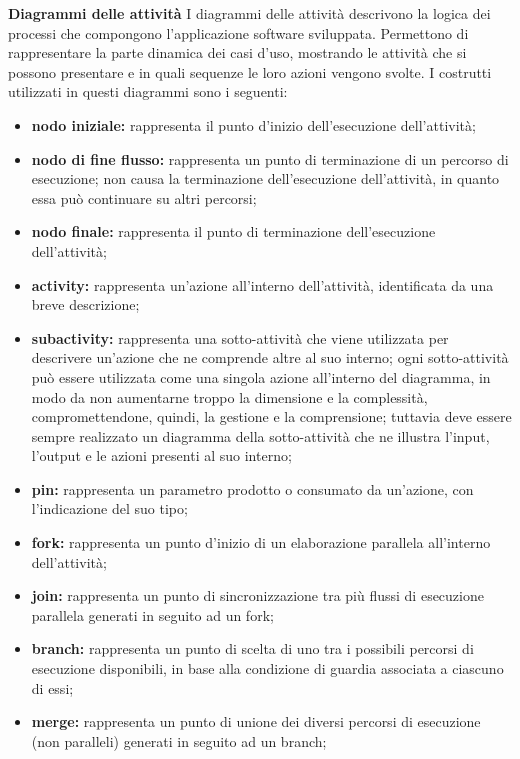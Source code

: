 						\textbf{Diagrammi delle attività}
						\newline
						\newline
						I diagrammi delle attività descrivono la logica dei processi che compongono l'applicazione software sviluppata. Permettono di rappresentare la parte dinamica dei casi d'uso, mostrando le attività che si possono presentare e in quali sequenze le loro azioni vengono svolte.
						\newline
						I costrutti utilizzati in questi diagrammi sono i seguenti:
						\begin{itemize}
							\item \textbf{nodo iniziale:} rappresenta il punto d'inizio dell'esecuzione dell'attività;
							\item \textbf{nodo di fine flusso:} rappresenta un punto di terminazione di un percorso di esecuzione; non causa la terminazione dell'esecuzione dell'attività, in quanto essa può continuare su altri percorsi; 
							\item \textbf{nodo finale:} rappresenta il punto di terminazione dell'esecuzione dell'attività;
							\item \textbf{activity:} rappresenta un'azione all'interno dell'attività, identificata da una breve descrizione;
							\item \textbf{subactivity:} rappresenta una sotto-attività che viene utilizzata per descrivere un'azione che ne comprende altre al suo interno; ogni sotto-attività può essere utilizzata come una singola azione all'interno del diagramma, in modo da non aumentarne troppo la dimensione e la complessità, compromettendone, quindi, la gestione e la comprensione; tuttavia deve essere sempre realizzato un diagramma della sotto-attività che ne illustra l'input, l'output e le azioni presenti al suo interno;
							\item \textbf{pin:} rappresenta un parametro prodotto o consumato da un'azione, con l'indicazione del suo tipo;
							\item \textbf{fork:} rappresenta un punto d'inizio di un elaborazione parallela all'interno dell'attività;
							\item \textbf{join:} rappresenta un punto di sincronizzazione tra più flussi di esecuzione parallela generati in seguito ad un fork;
							\item \textbf{branch:} rappresenta un punto di scelta di uno tra i possibili percorsi di esecuzione disponibili, in base alla condizione di guardia associata a ciascuno di essi;
							\item \textbf{merge:} rappresenta un punto di unione dei diversi percorsi di esecuzione (non paralleli) generati in seguito ad un branch;

\end{itemize}
